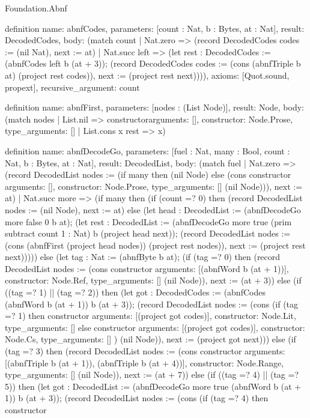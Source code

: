 \begin{lexlean}{Foundation.Abnf}
\begin{semanticmodule}
definition{
  name: abnfCodes,
  parameters: [count : Nat, b : Bytes, at : Nat],
  result: DecodedCodes,
  body: (match count
    | Nat.zero => (record DecodedCodes {codes := (nil Nat), next := at})
    | Nat.succ left => (let rest : DecodedCodes := (abnfCodes left b (at + 3)); (record DecodedCodes {codes := (cons (abnfTriple b at) (project rest codes)), next := (project rest next)}))),
  axioms: [Quot.sound, propext],
  recursive_argument: count
}

definition{
  name: abnfFirst,
  parameters: [nodes : (List Node)],
  result: Node,
  body: (match nodes
    | List.nil => constructor{arguments: [], constructor: Node.Prose, type_arguments: []}
    | List.cons x rest => x)
}

definition{
  name: abnfDecodeGo,
  parameters: [fuel : Nat, many : Bool, count : Nat, b : Bytes, at : Nat],
  result: DecodedList,
  body: (match fuel
    | Nat.zero => (record DecodedList {nodes := (if many then (nil Node) else (cons constructor{
      arguments: [],
      constructor: Node.Prose,
      type_arguments: []
    } (nil Node))), next := at})
    | Nat.succ more => (if many then (if (count =? 0) then (record DecodedList {nodes := (nil Node), next := at}) else (let head : DecodedList := (abnfDecodeGo more false 0 b at); (let rest : DecodedList := (abnfDecodeGo more true (prim subtract count 1 : Nat) b (project head next)); (record DecodedList {nodes := (cons (abnfFirst (project head nodes)) (project rest nodes)), next := (project rest next)})))) else (let tag : Nat := (abnfByte b at); (if (tag =? 0) then (record DecodedList {nodes := (cons constructor{
      arguments: [(abnfWord b (at + 1))],
      constructor: Node.Ref,
      type_arguments: []
    } (nil Node)), next := (at + 3)}) else (if ((tag =? 1) || (tag =? 2)) then (let got : DecodedCodes := (abnfCodes (abnfWord b (at + 1)) b (at + 3)); (record DecodedList {nodes := (cons (if (tag =? 1) then constructor{
      arguments: [(project got codes)],
      constructor: Node.Lit,
      type_arguments: []
    } else constructor{
      arguments: [(project got codes)],
      constructor: Node.Cs,
      type_arguments: []
    }) (nil Node)), next := (project got next)})) else (if (tag =? 3) then (record DecodedList {nodes := (cons constructor{
      arguments: [(abnfTriple b (at + 1)), (abnfTriple b (at + 4))],
      constructor: Node.Range,
      type_arguments: []
    } (nil Node)), next := (at + 7)}) else (if ((tag =? 4) || (tag =? 5)) then (let got : DecodedList := (abnfDecodeGo more true (abnfWord b (at + 1)) b (at + 3)); (record DecodedList {nodes := (cons (if (tag =? 4) then constructor{
}}}
\end{semanticmodule}
\end{lexlean}
